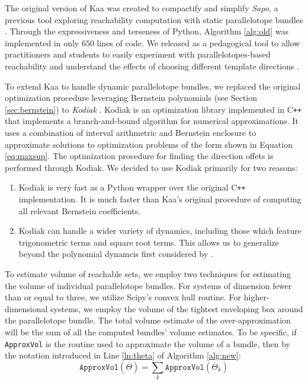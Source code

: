 The original version of Kaa was created to compactify and simplify \emph{Sapo}, a previous tool exploring reachability computation with static parallelotope bundles \cite{dreossi2017sapo}.
%
Through the expressiveness and terseness of Python, Algorithm \ref{alg:old} was implemented in only $650$ lines of code.
%
We released as a pedagogical tool to allow practitioners and students to easily experiment with parallelotopes-based reachability and understand the effects of choosing different template directions \cite{kim2020kaa}.

To extend Kaa to handle dynamic parallelotope bundles, we replaced the original optimization procedure leveraging Bernstein polynomials (see Section \ref{sec:bernstein}) to \emph{Kodiak} \cite{kodiak}.
%
%
Kodiak is an optimization library implemented in C\texttt{++} that implements a branch-and-bound algorithm for numerical approximations. It uses a combination of interval arithmetric and Bernstein enclosure to approximate solutions to optimization problems of the form shown in Equation \ref{eq:maxsup}.
%
The optimization procedure for finding the direction offets is performed through Kodiak.
%
We decided to use Kodiak primarily for two reasons:
%
\begin{enumerate}
  \item Kodiak is very fast as a Python wrapper over the original C\texttt{++} implementation. It is much faster than Kaa's original procedure of computing all relevant Bernstein coefficients.
  \item Kodiak can handle a wider variety of dynamics, including those which feature trigonometric terms and square root terms. This allows us to generalize beyond the polynomial dynamcis first considered by \cite{dreossi2016parallelotope}.
\end{enumerate}
%

To estimate volume of reachable sets, we employ two techniques for estimating the volume of individual parallelotope bundles. For systems of dimension fewer than or equal to three, we utilize Scipy's convex hull routine.
%
For higher-dimensional systems, we employ the volume of the tightest enveloping box around the parallelotope bundle.
%
The total volume estimate of the over-approximation will be the sum of all the computed bundles' volume estimates.
%
To be specific, if \texttt{ApproxVol} is the routine used to approximate the volume of a bundle, then by the notation introduced in Line \ref{ln:theta} of Algorithm \ref{alg:new}:
%
\begin{equation}
  \texttt{ApproxVol}(\overline\Theta) = \sum_{k} \texttt{ApproxVol}(\overline\Theta_k)
\end{equation}
